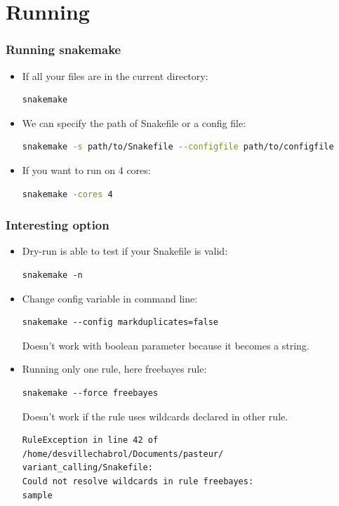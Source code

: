 \documentclass{beamer}
\begin{document}
\section{Running}

\begin{frame}[fragile]
    \frametitle{Running snakemake}
    \begin{itemize}
        \item If all your files are in the current directory:
            \begin{lstlisting}[language=bash]
    snakemake
            \end{lstlisting}
        \item We can specify the path of Snakefile or a config file:
            \begin{lstlisting}[language=bash]
    snakemake -s path/to/Snakefile --configfile path/to/configfile
            \end{lstlisting}
        \item If you want to run on 4 cores:
            \begin{lstlisting}[language=bash]
    snakemake -cores 4
            \end{lstlisting}
    \end{itemize}
\end{frame}

\begin{frame}[fragile]
    \frametitle{Interesting option}
    \begin{itemize}
        \item Dry-run is able to test if your Snakefile is valid:
        \begin{lstlisting}[language={}]
    snakemake -n
        \end{lstlisting}
        \item Change config variable in command line:
        \begin{lstlisting}[language={}]
    snakemake --config markduplicates=false
        \end{lstlisting}
        \begin{alertblock}{}
            Doesn't work with boolean parameter because it becomes a string. 
        \end{alertblock}
        \item Running only one rule, here freebayes rule:
        \begin{lstlisting}[language={}]
    snakemake --force freebayes
        \end{lstlisting}
        \begin{alertblock}{}
            Doesn't work if the rule uses wildcards declared in other rule.
            \begin{lstlisting}[language={}]
RuleException in line 42 of /home/desvillechabrol/Documents/pasteur/
variant_calling/Snakefile:
Could not resolve wildcards in rule freebayes:
sample
        \end{lstlisting}
        \end{alertblock}
    \end{itemize}
\end{frame}
\end{document}
